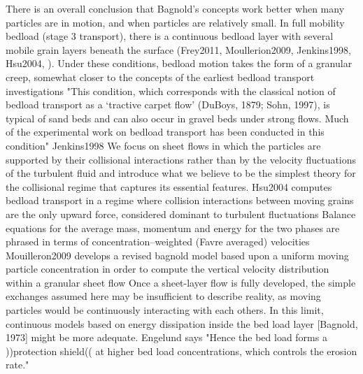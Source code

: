 \documentclass{article}
\begin{document}
There is an overall conclusion that Bagnold's concepts work better when many particles are in motion, and when particles are relatively small. 
In full mobility bedload (stage 3 transport), there is a continuous bedload layer with several mobile grain layers beneath the surface (Frey2011, Moullerion2009, Jenkins1998, Hsu2004, ).
Under these conditions, bedload motion takes the form of a granular creep, somewhat closer to the concepts of the earliest bedload transport investigations
"This condition, which corresponds with the classical notion of bedload transport as a ‘tractive carpet flow’ (DuBoys, 1879; Sohn, 1997), is typical of sand beds and can also occur in gravel beds under strong flows. Much of the experimental work on bedload transport has been conducted in this condition"
Jenkins1998 We focus on sheet flows in which the particles are supported by their collisional interactions rather than by the velocity fluctuations of the turbulent fluid and introduce what we believe to be the simplest theory for the collisional regime that captures its essential features.
Hsu2004 computes bedload transport in a regime where collision interactions between moving grains are the only upward force, considered dominant to turbulent fluctuations
Balance equations for the average mass, momentum and energy for the two phases are phrased in terms of concentration–weighted (Favre averaged) velocities
Mouilleron2009 develops a revised bagnold model based upon a uniform moving particle concentration in order to compute the vertical velocity distribution within a granular sheet flow 
Once a sheet-layer flow is fully developed, the simple exchanges assumed here may be insufficient to describe reality, as moving particles would be continuously interacting with each others. In this limit, continuous models based on energy dissipation inside the bed load layer [Bagnold, 1973] might be more adequate.
Engelund says "Hence the bed load forms a ))protection shield(( at higher bed load concentrations, which controls the erosion rate."











\end{document}
